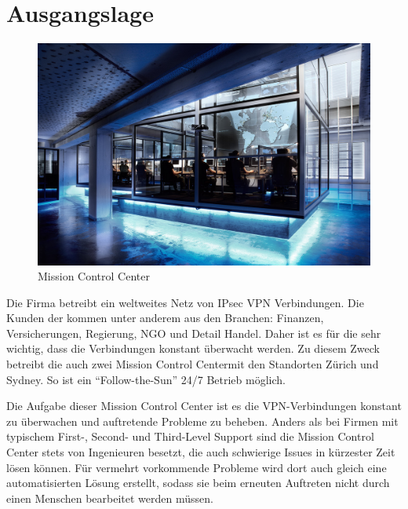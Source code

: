 \section{Ausgangslage}
\label{sec:Ausgangslage}

\begin{figure}
  \begin{center}
    \includegraphics[clip,scale=0.15]{mainpart/anforderungen/img/gallery_mc_01}
    \caption{Mission Control Center}
  \end{center}
\end{figure}


Die Firma \osag{} betreibt ein weltweites Netz von \ac{IPsec} \ac{VPN} Verbindungen. Die Kunden der \osag{} kommen unter anderem aus den Branchen: Finanzen, Versicherungen, Regierung, NGO und Detail Handel. Daher ist es für die \osag{} sehr wichtig, dass die Verbindungen konstant überwacht werden. Zu diesem Zweck betreibt die \osag{} auch zwei Mission Control Center\footnotemark[1] mit den Standorten Zürich und Sydney. So ist ein \enquote{Follow-the-Sun} 24/7 Betrieb möglich.


Die Aufgabe dieser Mission Control Center ist es die \ac{VPN}-Verbindungen konstant zu überwachen und auftretende Probleme zu beheben. Anders als bei Firmen mit typischem First-, Second- und Third-Level Support sind die Mission Control Center stets von Ingenieuren besetzt, die auch schwierige Issues in kürzester Zeit lösen können. Für vermehrt vorkommende Probleme wird dort auch gleich eine automatisierten Lösung erstellt, sodass sie beim erneuten Auftreten nicht durch einen Menschen bearbeitet werden müssen.

